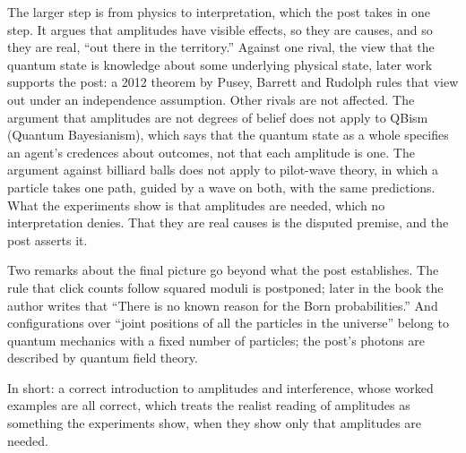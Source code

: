 \begin{afterword}
The larger step is from physics to interpretation, which the post takes in one step. It argues that amplitudes have visible effects, so they are causes, and so they are real, ``out there in the territory.'' Against one rival, the view that the quantum state is knowledge about some underlying physical state, later work supports the post: a 2012 theorem by Pusey, Barrett and Rudolph rules that view out under an independence assumption. Other rivals are not affected. The argument that amplitudes are not degrees of belief does not apply to QBism (Quantum Bayesianism), which says that the quantum state as a whole specifies an agent's credences about outcomes, not that each amplitude is one. The argument against billiard balls does not apply to pilot-wave theory, in which a particle takes one path, guided by a wave on both, with the same predictions. What the experiments show is that amplitudes are needed, which no interpretation denies. That they are real causes is the disputed premise, and the post asserts it.

Two remarks about the final picture go beyond what the post establishes. The rule that click counts follow squared moduli is postponed; later in the book the author writes that ``There is no known reason for the Born probabilities.'' And configurations over ``joint positions of all the particles in the universe'' belong to quantum mechanics with a fixed number of particles; the post's photons are described by quantum field theory.

In short: a correct introduction to amplitudes and interference, whose worked examples are all correct, which treats the realist reading of amplitudes as something the experiments show, when they show only that amplitudes are needed.
\end{afterword}
